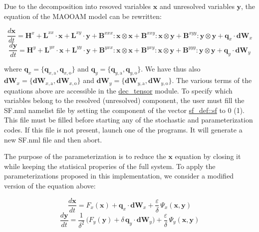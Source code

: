 Due to the decomposition into resoved variables $ \boldsymbol x$ and unresolved variables $ \boldsymbol y$, the equation of the M\+A\+O\+O\+AM model can be rewritten\+:

\[ \frac{d \boldsymbol x}{dt} = \boldsymbol{H}^x + \boldsymbol{L}^{xx}\cdot\boldsymbol{x} + \boldsymbol{L}^{xy}\cdot\boldsymbol{y} + \boldsymbol{B}^{xxx} : \boldsymbol{x} \otimes \boldsymbol{x} + \boldsymbol{B}^{xxy} : \boldsymbol{x} \otimes \boldsymbol{y} + \boldsymbol{B}^{xyy} : \boldsymbol{y} \otimes \boldsymbol{y} + \boldsymbol{q}_{x} \cdot \boldsymbol{dW}_x \] \[ \frac{d \boldsymbol y}{dt} = \boldsymbol{H}^y + \boldsymbol{L}^{yx}\cdot\boldsymbol{x} + \boldsymbol{L}^{yy}\cdot\boldsymbol{y} + \boldsymbol{B}^{yxx} : \boldsymbol{x} \otimes \boldsymbol{x} + \boldsymbol{B}^{yxy} : \boldsymbol{x} \otimes \boldsymbol{y} + \boldsymbol{B}^{yyy} : \boldsymbol{y} \otimes \boldsymbol{y} + \boldsymbol{q}_{y} \cdot \boldsymbol{dW}_y \]

where $\boldsymbol{q}_x= \{\boldsymbol{q}_{x,\text{a}},\boldsymbol{q}_{x,\text{o}}\}$ and $\boldsymbol{q}_y= \{\boldsymbol{q}_{y,\text{a}},\boldsymbol{q}_{y,\text{o}}\}$. We have thus also $\boldsymbol{dW}_x=\{\boldsymbol{dW}_{x,\text{a}},\boldsymbol{dW}_{x,\text{o}}\}$ and $\boldsymbol{dW}_y= \{\boldsymbol{dW}_{y,\text{a}},\boldsymbol{dW}_{y,\text{o}}\}$. The various terms of the equations above are accessible in the \hyperlink{namespacedec__tensor}{dec\+\_\+tensor} module. To specify which variables belong to the resolved (unresolved) component, the user must fill the S\+F.\+nml namelist file by setting the component of the vector \hyperlink{namespacesf__def_ad000452ff3b9c4c5ce070c04d0521b52}{sf\+\_\+def\+::sf} to 0 (1). This file must be filled before starting any of the stochastic and parameterization codes. If this file is not present, launch one of the programs. It will generate a new S\+F.\+nml file and then abort.

The purpose of the parameterization is to reduce the $\boldsymbol x$ equation by closing it while keeping the statisical properies of the full system. To apply the parameterizations proposed in this implementation, we consider a modified version of the equation above\+:

\[ \frac{d \boldsymbol x}{dt} = F_x(\boldsymbol{x}) + \boldsymbol{q}_{x} \cdot \boldsymbol{dW}_x + \frac{\varepsilon}{\delta} \, \Psi_x(\boldsymbol{x},\boldsymbol{y}) \] \[ \frac{d \boldsymbol y}{dt} = \frac{1}{\delta^2}\, \Big( F_y(\boldsymbol{y}) + \delta \, \boldsymbol{q}_{y} \cdot \boldsymbol{dW}_y \Big) + \frac{\varepsilon}{\delta} \, \Psi_y(\boldsymbol{x},\boldsymbol{y}) \]

